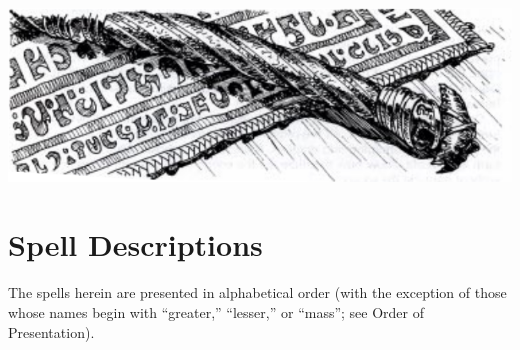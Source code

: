 



% 




\begin{strip}
{
\begin{center}
\includegraphics[width=\textwidth-25mm]{images/filler-1.png}
\WOTC
\end{center}
}
\section{Spell Descriptions}
The spells herein are presented in alphabetical order (with the exception of those whose names begin with ``greater,'' ``lesser,'' or ``mass''; see Order of Presentation).
\end{strip}

